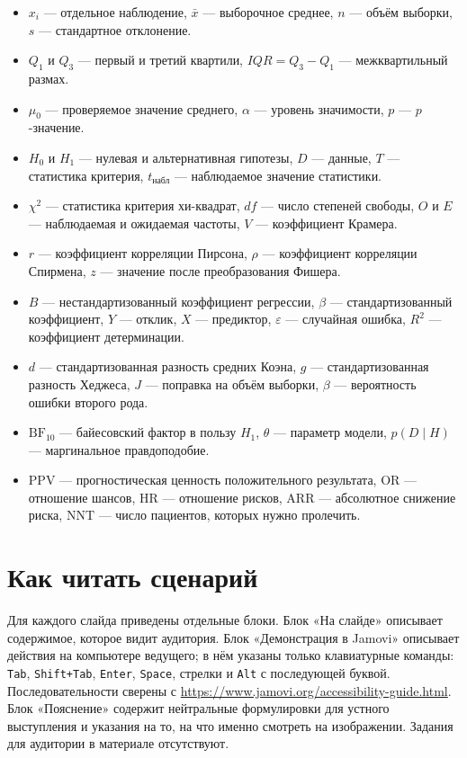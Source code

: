 \documentclass[11pt,a4paper]{article}
\begin{document}
\begin{tcolorbox}[title={Условные обозначения в формулах}]
\begin{itemize}\footnotesize
\item $x_i$ — отдельное наблюдение, $\bar{x}$ — выборочное среднее, $n$ — объём выборки, $s$ — стандартное отклонение.
\item $Q_1$ и $Q_3$ — первый и третий квартили, $IQR=Q_3-Q_1$ — межквартильный размах.
\item $\mu_0$ — проверяемое значение среднего, $\alpha$ — уровень значимости, $p$ — $p$-значение.
\item $H_0$ и $H_1$ — нулевая и альтернативная гипотезы, $D$ — данные, $T$ — статистика критерия, $t_{\text{набл}}$ — наблюдаемое значение статистики.
\item $\chi^2$ — статистика критерия хи-квадрат, $df$ — число степеней свободы, $O$ и $E$ — наблюдаемая и ожидаемая частоты, $V$ — коэффициент Крамера.
\item $r$ — коэффициент корреляции Пирсона, $\rho$ — коэффициент корреляции Спирмена, $z$ — значение после преобразования Фишера.
\item $B$ — нестандартизованный коэффициент регрессии, $\beta$ — стандартизованный коэффициент, $Y$ — отклик, $X$ — предиктор, $\varepsilon$ — случайная ошибка, $R^2$ — коэффициент детерминации.
\item $d$ — стандартизованная разность средних Коэна, $g$ — стандартизованная разность Хеджеса, $J$ — поправка на объём выборки, $\beta$ — вероятность ошибки второго рода.
\item $\mathrm{BF}_{10}$ — байесовский фактор в пользу $H_1$, $\theta$ — параметр модели, $p(D\mid H)$ — маргинальное правдоподобие.
\item $\mathrm{PPV}$ — прогностическая ценность положительного результата, $\mathrm{OR}$ — отношение шансов, $\mathrm{HR}$ — отношение рисков, $\mathrm{ARR}$ — абсолютное снижение риска, $\mathrm{NNT}$ — число пациентов, которых нужно пролечить.
\end{itemize}
\end{tcolorbox}

\section*{Как читать сценарий}

Для каждого слайда приведены отдельные блоки. Блок «На слайде» описывает содержимое,
которое видит аудитория. Блок «Демонстрация в Jamovi» описывает действия на компьютере
ведущего; в нём указаны только клавиатурные команды: \texttt{Tab}, \texttt{Shift+Tab},
\texttt{Enter}, \texttt{Space}, стрелки и \texttt{Alt} с последующей буквой. Последовательности сверены с \url{https://www.jamovi.org/accessibility-guide.html}. Блок
«Пояснение» содержит нейтральные формулировки для устного выступления и указания на
то, на что именно смотреть на изображении. Задания для аудитории в материале
отсутствуют.
\end{document}
